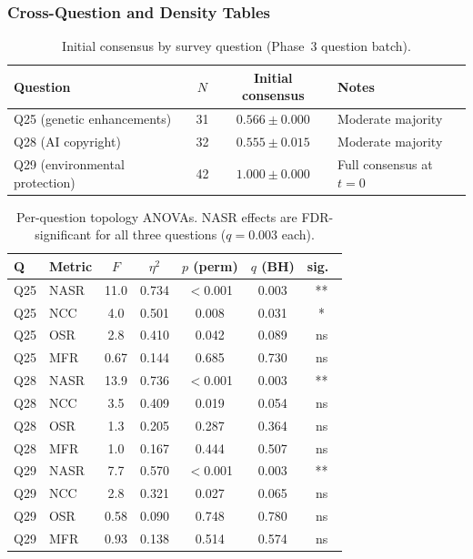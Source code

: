 \documentclass[11pt]{article}
\begin{document}
\subsubsection{Cross-Question and Density Tables}

\begin{table}[h]
\centering
\small
\begin{tabular}{lccl}
\toprule
Question & $N$ & Initial consensus & Notes \\
\midrule
Q25 (genetic enhancements)     & 31 & $0.566 \pm 0.000$ & Moderate majority \\
Q28 (AI copyright)             & 32 & $0.555 \pm 0.015$ & Moderate majority \\
Q29 (environmental protection) & 42 & $1.000 \pm 0.000$ & Full consensus at $t=0$ \\
\bottomrule
\end{tabular}
\caption{Initial consensus by survey question (Phase~3 question batch).}
\label{tab:phase3_init_consensus}
\end{table}

\begin{table}[h]
\centering
\small
\begin{tabular}{llccccc}
\toprule
Q & Metric & $F$ & $\eta^2$ & $p$ (perm) & $q$ (BH) & sig.\ \\
\midrule
Q25 & NASR & 11.0 & 0.734 & $<$0.001 & 0.003 & ** \\
Q25 & NCC  &  4.0 & 0.501 & 0.008    & 0.031 & * \\
Q25 & OSR  &  2.8 & 0.410 & 0.042    & 0.089 & ns \\
Q25 & MFR  & 0.67 & 0.144 & 0.685    & 0.730 & ns \\
Q28 & NASR & 13.9 & 0.736 & $<$0.001 & 0.003 & ** \\
Q28 & NCC  &  3.5 & 0.409 & 0.019    & 0.054 & ns \\
Q28 & OSR  &  1.3 & 0.205 & 0.287    & 0.364 & ns \\
Q28 & MFR  &  1.0 & 0.167 & 0.444    & 0.507 & ns \\
Q29 & NASR &  7.7 & 0.570 & $<$0.001 & 0.003 & ** \\
Q29 & NCC  &  2.8 & 0.321 & 0.027    & 0.065 & ns \\
Q29 & OSR  & 0.58 & 0.090 & 0.748    & 0.780 & ns \\
Q29 & MFR  & 0.93 & 0.138 & 0.514    & 0.574 & ns \\
\bottomrule
\end{tabular}
\caption{Per-question topology ANOVAs. NASR effects are FDR-significant for all three questions ($q = 0.003$ each).}
\label{tab:phase3_question_anova}
\end{table}
\end{document}
